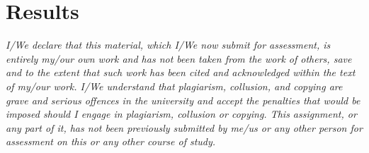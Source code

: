 \documentclass[14pt]{extarticle}
\begin{document}
\section{Results}
{\it I/We declare that this material, which I/We now submit for assessment, is entirely my/our own work and has not been taken from the work of others, save and to the extent that such work has been cited and acknowledged within the text of my/our work. I/We understand that plagiarism, collusion, and copying are grave and serious offences in the university and accept the penalties that would be imposed should I engage in plagiarism, collusion or copying. This assignment, or any part of it, has not been previously submitted by me/us or any other person for assessment on this or any other course of study.}

\end{document}
